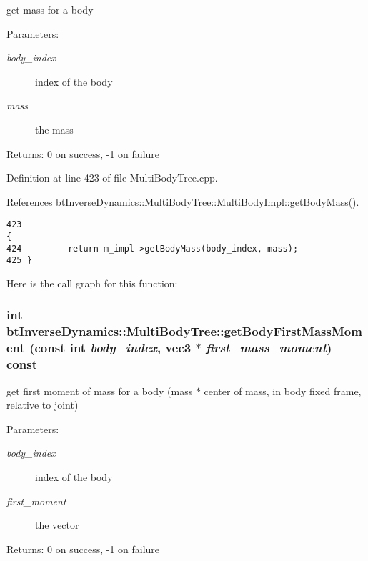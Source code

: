 get mass for a body \begin{Desc}
\item[Parameters:]
\begin{description}
\item[{\em body\_\-index}]index of the body \item[{\em mass}]the mass \end{description}
\end{Desc}
\begin{Desc}
\item[Returns:]0 on success, -1 on failure \end{Desc}


Definition at line 423 of file MultiBodyTree.cpp.

References btInverseDynamics::MultiBodyTree::MultiBodyImpl::getBodyMass().

\begin{Code}\begin{verbatim}423                                                                          {
424         return m_impl->getBodyMass(body_index, mass);
425 }
\end{verbatim}
\end{Code}




Here is the call graph for this function:\hypertarget{classbt_inverse_dynamics_1_1_multi_body_tree_65cf073d371fb6c028649964d21fedce}{
\subsubsection[getBodyFirstMassMoment]{\setlength{\rightskip}{0pt plus 5cm}int btInverseDynamics::MultiBodyTree::getBodyFirstMassMoment (const int {\em body\_\-index}, \/  {\bf vec3} $\ast$ {\em first\_\-mass\_\-moment}) const}}
\label{classbt_inverse_dynamics_1_1_multi_body_tree_65cf073d371fb6c028649964d21fedce}


get first moment of mass for a body (mass $\ast$ center of mass, in body fixed frame, relative to joint) \begin{Desc}
\item[Parameters:]
\begin{description}
\item[{\em body\_\-index}]index of the body \item[{\em first\_\-moment}]the vector \end{description}
\end{Desc}
\begin{Desc}
\item[Returns:]0 on success, -1 on failure \end{Desc}


